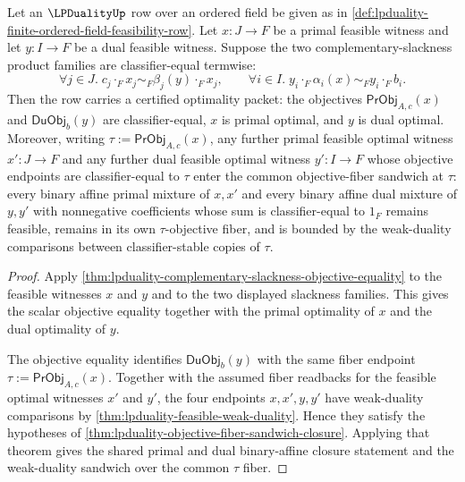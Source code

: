 \begin{theorem}
\label{thm:lpduality-weak-duality-slackness-optimality-packet}
Let an $\LPDualityUp$ row over an ordered field be given as in
\autoref{def:lpduality-finite-ordered-field-feasibility-row}. Let $x:J\to F$
be a primal feasible witness and let $y:I\to F$ be a dual feasible witness.
Suppose the two complementary-slackness product families are
classifier-equal termwise:
$$
\forall j\in J.\; c_j\cdot_Fx_j\sim_F\beta_j(y)\cdot_Fx_j,
\qquad
\forall i\in I.\; y_i\cdot_F\alpha_i(x)\sim_Fy_i\cdot_Fb_i.
$$
Then the row carries a certified optimality packet: the objectives
$\mathsf{PrObj}_{A,c}(x)$ and $\mathsf{DuObj}_{b}(y)$ are classifier-equal,
$x$ is primal optimal, and $y$ is dual optimal. Moreover, writing
$\tau:=\mathsf{PrObj}_{A,c}(x)$, any further primal feasible optimal witness
$x':J\to F$ and any further dual feasible optimal witness $y':I\to F$ whose
objective endpoints are classifier-equal to $\tau$ enter the common
objective-fiber sandwich at $\tau$: every binary affine primal mixture of
$x,x'$ and every binary affine dual mixture of $y,y'$ with nonnegative
coefficients whose sum is classifier-equal to $1_F$ remains feasible, remains
in its own $\tau$-objective fiber, and is bounded by the weak-duality
comparisons between classifier-stable copies of $\tau$.
\end{theorem}
\begin{proof}
Apply \autoref{thm:lpduality-complementary-slackness-objective-equality} to
the feasible witnesses $x$ and $y$ and to the two displayed slackness
families. This gives the scalar objective equality together with the primal
optimality of $x$ and the dual optimality of $y$.

The objective equality identifies $\mathsf{DuObj}_{b}(y)$ with the same fiber
endpoint $\tau:=\mathsf{PrObj}_{A,c}(x)$. Together with the assumed fiber
readbacks for the feasible optimal witnesses $x'$ and $y'$, the four
endpoints $x,x',y,y'$ have weak-duality comparisons by
\autoref{thm:lpduality-feasible-weak-duality}. Hence they satisfy the
hypotheses of \autoref{thm:lpduality-objective-fiber-sandwich-closure}.
Applying that theorem gives the shared primal and dual binary-affine closure
statement and the weak-duality sandwich over the common $\tau$ fiber.
\end{proof}
